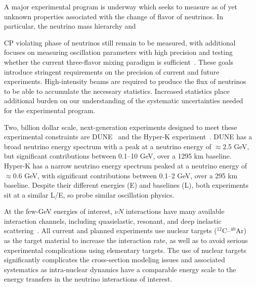 A major experimental program is underway which seeks to measure
as of yet unknown properties associated with the change of flavor of neutrinos.
In particular, the neutrino mass hierarchy and%
\begin{marginnote}
\end{marginnote}%
CP violating phase
of neutrinos still remain to be measured, with additional focuses on measuring
oscillation parameters with high precision and testing whether the current
three-flavor mixing paradigm is sufficient~\cite{Esteban:2020cvm, ParticleDataGroup:2020ssz}.
These goals introduce stringent requirements on the precision of current and future experiments.
High-intensity beams are required to produce the flux of neutrinos to be able to accumulate the necessary statistics.
Increased statistics place additional burden on our understanding of the systematic uncertainties needed for the experimental program.


Two, billion dollar scale, next-generation experiments designed to meet these experimental constraints
are
DUNE~\cite{Abi:2020wmh}
and the
Hyper-K experiment~\cite{Hyper-Kamiokande:2018ofw}.
DUNE has a broad neutrino energy spectrum with a peak at a neutrino energy of $\approx$2.5 GeV,
but significant contributions between 0.1--10 GeV, over a 1295 km baseline.
Hyper-K has a narrow neutrino energy spectrum peaked at a neutrino energy of $\approx$0.6 GeV, with significant
contributions between 0.1--2 GeV, over a 295 km baseline. Despite their different energies (E) and
baselines (L), both experiments sit at a similar L/E, so probe similar oscillation physics.%
\begin{marginnote}
\end{marginnote}%
At the few-GeV energies of interest, $\nu N$ interactions have many available interaction channels,
including quasielastic, resonant, and deep inelastic scattering~\cite{zeller12, hayato_review_2014, Mosel:2016cwa, Katori:2016yel, NuSTEC:2017hzk}.
All current and planned experiments use nuclear targets ($^{12}$C--$^{40}$Ar) as the
target material to increase the interaction rate, as well as to avoid serious experimental complications using elementary targets.
The use of nuclear targets significantly complicates the cross-section modeling issues and
associated systematics as intra-nuclear dynamics have a comparable energy scale to
the energy transfers in the neutrino interactions of interest.

